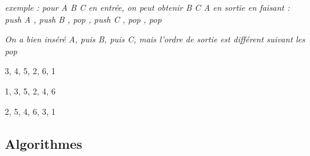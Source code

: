 \documentclass[11pt,a4paper]{article}
\begin{document}
\smallskip

\begin{center}
\noindent \textit{exemple : pour \og A B C \fg{} en entrée, on peut obtenir \og B C A \fg{} en sortie en faisant : \linebreak
\og push A \fg, \og push B \fg, \og pop \fg, \og push C \fg, \og pop \fg, \og pop \fg }

\noindent \textit{On a bien inséré A, puis B, puis C, mais l'ordre de sortie est différent suivant les \og pop \fg}
\end{center}


\begin{center}

\begin{large}
3, 4, 5, 2, 6, 1
\end{large}

\begin{center}
\end{center}


\begin{large}
1, 3, 5, 2, 4, 6
\end{large}

\begin{center}
\end{center}


\begin{large}
2, 5, 4, 6, 3, 1
\end{large}

\begin{center}
\end{center}

\end{center}



\clearpage

\subsection*{Algorithmes}
\end{document}
